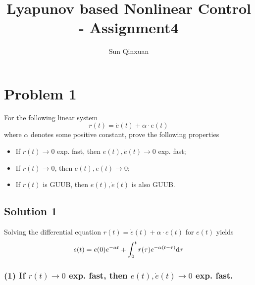 \documentclass[12pt,a4paper]{article}
\title{Lyapunov based Nonlinear Control - Assignment4}
\author{Sun Qinxuan}
\begin{document}
\maketitle

\section*{Problem 1}
For the following linear system
$$
r(t)=\dot{e}(t)+\alpha\cdot e(t)
$$
where $\alpha$ denotes some positive constant, prove the following properties
\begin{itemize}
    \item If $r(t)\rightarrow 0$ exp. fast, then $e(t), \dot{e}(t)\rightarrow 0$ exp. fast;
    \item If $r(t)\rightarrow 0$, then $e(t), \dot{e}(t)\rightarrow 0$;
    \item If $r(t)$ is GUUB, then $e(t), \dot{e}(t)$ is also GUUB.
\end{itemize}

\subsection*{Solution 1}

\indent Solving the differential equation $r(t)=\dot{e}(t)+\alpha\cdot e(t)$ for $e(t)$ yields
\begin{equation}
e(t)=e(0)e^{-\alpha t}+\int_0^t{r(\tau)e^{-\alpha(t-\tau)}}{\rm d}\tau
\label{diffe}
\end{equation}

\subsubsection*{(1) If $r(t)\rightarrow 0$ exp. fast, then $e(t), \dot{e}(t)\rightarrow 0$ exp. fast.}
\end{document}
